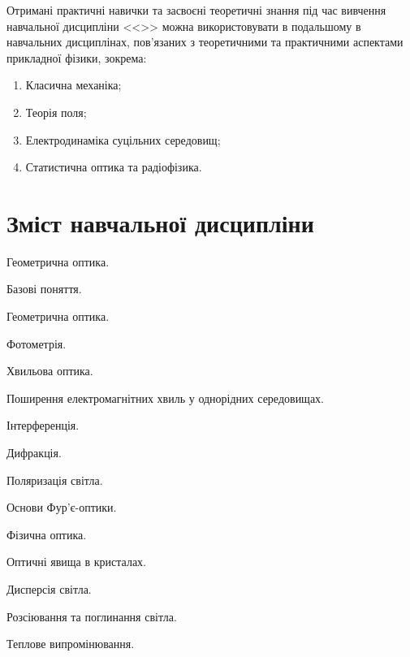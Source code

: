 \documentclass{Syllabus}
\begin{document}
Отримані практичні навички та засвоєні теоретичні знання під час вивчення навчальної дисципліни <<\discipline>> можна використовувати в подальшому в навчальних дисциплінах, пов’язаних з теоретичними та практичними аспектами прикладної фізики, зокрема:

\begin{enumerate}
    \item Класична механіка;
    \item Теорія поля;
    \item Електродинаміка суцільних середовищ;
    \item Статистична оптика та радіофізика.
\end{enumerate}


\section{Зміст навчальної дисципліни}


\begin{Rozdil}
\item Геометрична оптика.
    \begin{Rozdil}
        \item Базові поняття.
        \item Геометрична оптика.
        \item Фотометрія.
    \end{Rozdil}
\item Хвильова оптика.
    \begin{Rozdil}
        \item Поширення електромагнітних хвиль у однорідних середовищах.
        \item Інтерференція.
        \item Дифракція.
        \item Поляризація світла.
        \item Основи Фур’є-оптики.
    \end{Rozdil}
\item Фізична оптика.
    \begin{Rozdil}
        \item Оптичні явища в кристалах.
        \item Дисперсія світла.
        \item Розсіювання та поглинання світла.
        \item Теплове випромінювання.
    \end{Rozdil}
\end{Rozdil}
\end{document}
